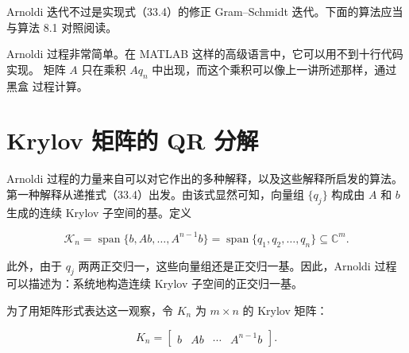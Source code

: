 \documentclass[UTF8,fontset=none,12pt]{ctexart}
\begin{document}
Arnoldi 迭代不过是实现式（33.4）的修正 Gram--Schmidt 迭代。下面的算法应当
与算法 8.1 对照阅读。

\begin{center}
\end{center}

Arnoldi 过程非常简单。在 MATLAB 这样的高级语言中，它可以用不到十行代码实现。
矩阵 $A$ 只在乘积 $Aq_n$ 中出现，而这个乘积可以像上一讲所述那样，通过黑盒
过程计算。

\section*{Krylov 矩阵的 QR 分解}

Arnoldi 过程的力量来自可以对它作出的多种解释，以及这些解释所启发的算法。
第一种解释从递推式（33.4）出发。由该式显然可知，向量组 $\{q_j\}$ 构成由
$A$ 和 $b$ 生成的连续 Krylov 子空间的基。定义

\begin{equation}
\mathcal K_n
=\operatorname{span}\{b,Ab,\ldots,A^{n-1}b\}
=\operatorname{span}\{q_1,q_2,\ldots,q_n\}
\subseteq\mathbb C^m.
\tag{33.5}
\end{equation}

此外，由于 $q_j$ 两两正交归一，这些向量组还是正交归一基。因此，Arnoldi 过程
可以描述为：系统地构造连续 Krylov 子空间的正交归一基。

为了用矩阵形式表达这一观察，令 $K_n$ 为 $m\times n$ 的 Krylov 矩阵：

\begin{equation}
K_n=
\begin{bmatrix}
b&Ab&\cdots&A^{n-1}b
\end{bmatrix}.
\tag{33.6}
\end{equation}
\end{document}
